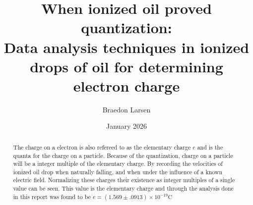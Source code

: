 \documentclass[%
 reprint,
 amsmath,amssymb,
 aps,
]{revtex4-2}
\begin{document}
\title{When ionized oil proved quantization:\\ Data analysis techniques in ionized drops of oil for determining electron charge  }
\author{Braedon Larsen}


\date{January 2026}

\begin{abstract}
The charge on a electron is also refereed to as the elementary charge $e$ and is the quanta for the charge on a particle. Because of the quantization, charge on a particle will be a integer multiple of the elementary charge. By recording the velocities of ionized oil drop when naturally falling, and when under the influence of a known electric field. Normalizing these charges their existence as integer multiples of a single value can be seen. This value is the elementary charge and through the analysis done in this report was found to be $e = (1.569 \pm .0913) \times 10^{-19} \text{C}$
\end{abstract}

\maketitle
\end{document}
